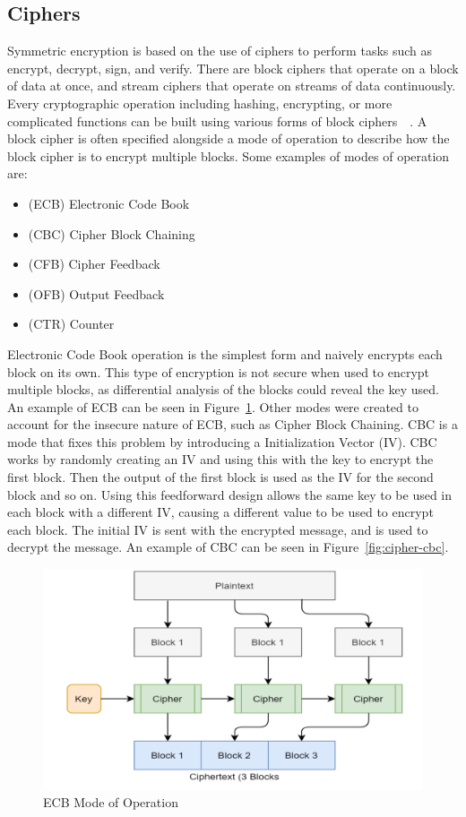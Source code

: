 \documentclass[journal]{IEEEtran}
\begin{document}
\subsection{Ciphers}
Symmetric encryption is based on the use of ciphers to perform tasks such as encrypt, decrypt, sign, and verify. There are block ciphers that operate on a block of data at once, and stream ciphers that operate on streams of data continuously. Every cryptographic operation including hashing, encrypting, or more complicated functions can be built using various forms of block ciphers~\cite{BC1}~\cite{BC2}. A block cipher is often specified alongside a mode of operation to describe how the block cipher is to encrypt multiple blocks. Some examples of modes of operation are:
\begin{itemize}
        \item (ECB) Electronic Code Book
        \item (CBC) Cipher Block Chaining
        \item (CFB) Cipher Feedback
        \item (OFB) Output Feedback
        \item (CTR) Counter
\end{itemize}
Electronic Code Book operation is the simplest form and naively encrypts each block on its own. This type of encryption is not secure when used to encrypt multiple blocks, as differential analysis of the blocks could reveal the key used. An example of ECB can be seen in Figure~\ref{fig:cipher-ecb}. Other modes were created to account for the insecure nature of ECB, such as Cipher Block Chaining. CBC is a mode that fixes this problem by introducing a Initialization Vector (IV). CBC works by randomly creating an IV and using this with the key to encrypt the first block. Then the output of the first block is used as the IV for the second block and so on. Using this feedforward design allows the same key to be used in each block with a different IV, causing a different value to be used to encrypt each block. The initial IV is sent with the encrypted message, and is used to decrypt the message. An example of CBC can be seen in Figure~\ref{fig:cipher-cbc}. 
\begin{figure}[!htb]
\centerline{\includegraphics[totalheight=5cm]{pictures/cipher-ecb.png}}
    \caption{ECB Mode of Operation}
    \label{fig:cipher-ecb}
\end{figure}
\end{document}
